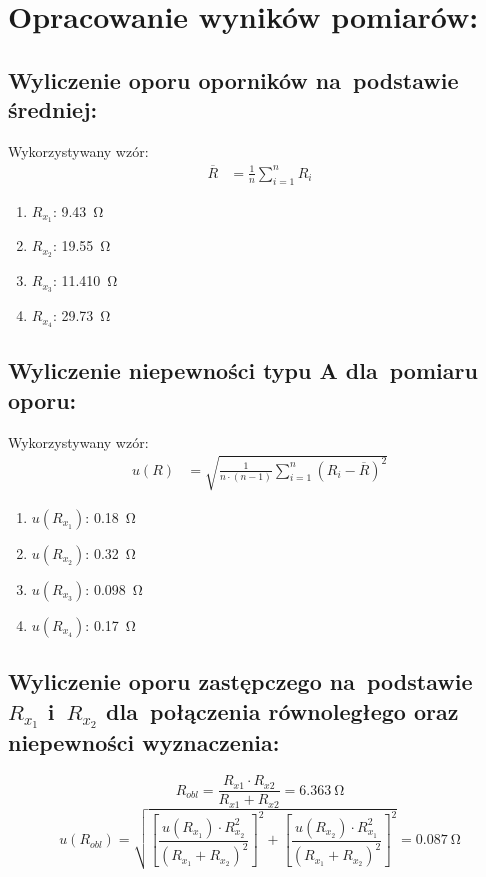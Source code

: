 \documentclass{fizraport}
\begin{document}
\section{Opracowanie wyników pomiarów:}
\subsection{Wyliczenie oporu oporników na~podstawie średniej:}
Wykorzystywany wzór:
\begin{align*}
   \overline{R} &= \frac{1}{n}  \sum\limits_{i=1}^{n}{R_{i}}
\end{align*}
\begin{enumerate}
    \item $R_{x_1}$:  \SI{9.43}{\ohm}
    \item $R_{x_2}$:  \SI{19.55}{\ohm}
    \item $R_{x_3}$:  \SI{11.410}{\ohm}
    \item $R_{x_4}$:  \SI{29.73}{\ohm}
\end{enumerate}

\subsection{Wyliczenie niepewności typu A dla~pomiaru oporu:}
Wykorzystywany wzór:
\begin{align*}
    u(R) &= \sqrt{\frac{1}{n\cdot(n-1)}\sum\limits_{i=1}^{n}{(R_{i} - \overline{R})^2}}  
\end{align*}
\begin{enumerate}
    \item $u(R_{x_1})$:  \SI{0.18}{\ohm}
    \item $u(R_{x_2})$:  \SI{0.32}{\ohm}
    \item $u(R_{x_3})$:  \SI{0.098}{\ohm}
    \item $u(R_{x_4})$:  \SI{0.17}{\ohm}
\end{enumerate}   

\subsection{Wyliczenie oporu zastępczego na~podstawie $R_{x_1}$ i~$R_{x_2}$ dla~połączenia równoległego oraz niepewności wyznaczenia:}
\begin{equation*}
    R_{{obl}} = \frac{R_{x1} \cdot R_{x2}}{R_{x1} + R_{x2}} = \SI{6.363}{\ohm}
\end{equation*}
\begin{equation*}
    u(R_{obl}) = \sqrt{\left [\frac{u(R_{x_1})\cdot R_{x_2}^2}{(R_{x_1} + R_{x_2})^2} \right ]  ^2 + \left [\frac{u(R_{x_2})\cdot R_{x_1}^2}{(R_{x_1} + R_{x_2})^2} \right] ^2} = \SI{0.087}{\ohm}%
\end{equation*}
\end{document}
